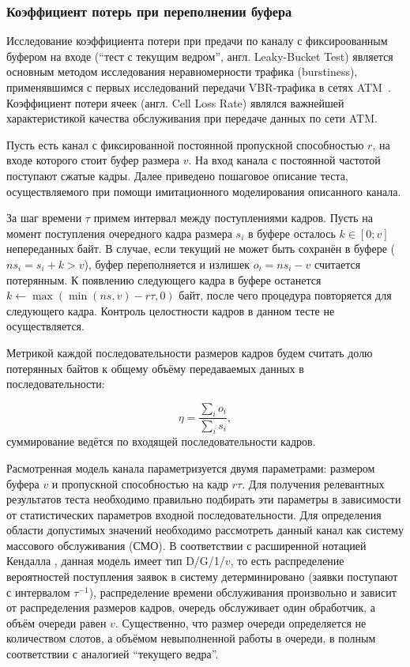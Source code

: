 \subsubsection{Коэффициент потерь при переполнении буфера}
\hspace{3pt}

Исследование коэффициента потери при предачи по каналу
с фиксироованным буфером на входе (``тест с текущим ведром'',
англ. Leaky-Bucket Test) является основным
методом исследования неравномерности трафика (burstiness),
применявшимся с первых исследований передачи VBR-трафика
в сетях ATM~\cite{heymanATM, heymansourcemodels}.
Коэффициент потери ячеек (англ. Cell Loss Rate) являлся
важнейшей характеристикой качества обслуживания при передаче
данных по сети ATM.

Пусть есть канал с фиксированной постоянной пропускной
способностью $r$, на входе которого стоит буфер размера $v$.
На вход канала с постоянной частотой поступают сжатые
кадры. Далее приведено пошаговое описание теста, осуществляемого
при помощи имитационного моделирования описанного канала.

За шаг времени $\tau$ примем интервал между поступлениями
кадров. Пусть на момент поступления очередного кадра размера
$s_i$ в буфере осталось $k \in [0; v]$ непереданных байт.
В случае, если текущий не может быть сохранён
в буфере ($ns_i = s_i + k > v$), буфер переполняется и излишек $o_i = ns_i - v$
считается потерянным. К появлению следующего кадра
в буфере останется $k \leftarrow \max(\min(ns, v) - r\tau, 0)$ байт,
после чего процедура повторяется для следующего кадра.
Контроль целостности кадров в данном тесте не осуществляется.

Метрикой каждой последовательности размеров кадров будем считать
долю потерянных байтов к общему объёму передаваемых данных
в последовательности:

\begin{equation}
    \eta = \frac{\sum_i o_i}{\sum_i s_i},
\end{equation}
суммирование ведётся по входящей последовательности кадров.

Расмотренная модель канала параметризуется двумя параметрами:
размером буфера $v$ и пропускной способностью на кадр $r\tau$.
Для получения релевантных результатов теста необходимо правильно
подбирать эти параметры в зависимости от статистических параметров
входной последовательности. Для определения области допустимых значений
необходимо рассмотреть данный канал как систему массового обслуживания
\cite{bertsekas}
(СМО). В соответствии с расширенной нотацией Кендалла
\cite{kendall},
данная модель имеет тип D/G/1/$v$, то есть распределение
вероятностей поступления заявок в систему детерминировано
(заявки поступают с интервалом $\tau^{-1}$), распределение
времени обслуживания произвольно и зависит от распределения
размеров кадров, очередь обслуживает один обработчик,
а объём очереди равен $v$. Существенно, что размер очереди
определяется не количеством слотов, а объёмом невыполненной
работы в очереди, в полным соответствии с аналогией ``текущего
ведра''.

